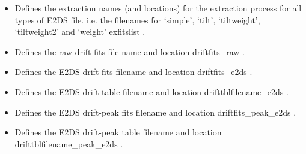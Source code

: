 \begin{itemize}
	\item {} 
	{Defines the extraction names (and locations) for the extraction process for all types of E2DS file. i.e. the filenames for `simple', `tilt', `tiltweight', `tiltweight2' and `weight'}
	{exfitslist}
	{\calextractRAW}{\spirouConst.}{\calextractRAW}
\end{itemize}


\begin{itemize}
	\item {} 
	{Defines the raw drift fits file name and location}
	{driftfits\_raw}
	{\calDRIFTRAW}{\spirouConst.}{\calDRIFTRAW}
\end{itemize}

\begin{itemize}
	\item {} 
	{Defines the E2DS drift fits filename and location}
	{driftfits\_e2ds}
	{\calDRIFTE}{\spirouConst.}{\calDRIFTE}
\end{itemize}


\begin{itemize}
	\item {} 
	{Defines the E2DS drift table filename and location}
	{drifttblfilename\_e2ds}
	{\calDRIFTE}{\spirouConst.}{\calDRIFTE}
\end{itemize}


\begin{itemize}
	\item {} 
	{Defines the E2DS drift-peak fits filename and location}
	{driftfits\_peak\_e2ds}
	{\calDRIFTPEAK}{\spirouConst.}{\calDRIFTPEAK}
\end{itemize}


\begin{itemize}
	\item {} 
	{Defines the E2DS drift-peak table filename and location}
	{drifttblfilename\_peak\_e2ds}
	{\calDRIFTPEAK}{\spirouConst.}{\calDRIFTPEAK}
\end{itemize}


